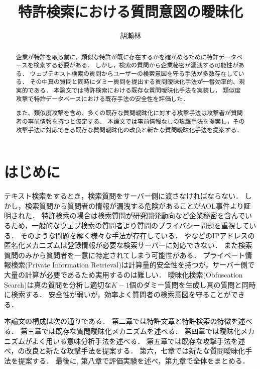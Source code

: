\documentclass[master]{suribt}
\title{特許検索における質問意図の曖昧化}
\author{胡瀚林}
\theoremstyle{definition}
\begin{document}
\maketitle%

\frontmatter%
\begin{abstract}%
 企業が特許を取る前に，類似な特許が既に存在するかを確かめるために特許データベースを検索する必要がある．
 しかし，検索の質問から企業秘密が漏洩する可能性がある．
 ウェブテキスト検索の質問からユーザーの検索意図を守る手法が多数存在している．
 その中真の質問と同時にダミー質問を提出する質問曖昧化手法が一番効率的、現実的である．
 本論文では特許検索における既存な質問曖昧化手法\cite{providing2009,embellishing2010,masking2014}を実装し，
 類似度攻撃\cite{simattack2016}で特許データベースにおける既存手法の安全性を評価した．

 また、類似度攻撃\cite{simattack2016}を含め、多くの既存な質問曖昧化に対する攻撃手法は攻撃者が質問者の事前情報を持つと仮定する．
 本論文では事前情報なしの攻撃手法を提案し，その攻撃手法に対応できる既存な質問曖昧化の改良と新たな質問曖昧化手法を提案する．
\end{abstract}

 \tableofcontents%

 \mainmatter%
 \chapter{はじめに}

 テキスト検索をするとき，検索質問をサーバー側に渡さなければならない．
 しかし，検索質問から質問者の情報が漏洩する危険があることがAOL事件\cite{AOL}より証明された．
 特許検索の場合は検索質問が研究開発動向など企業秘密を含んでいるため，一般的なウェブ検索の質問者より質問のプライバシー問題を重視している．
 そのような問題を解く様々な手法が存在している．
 \cite{tor2004}や\cite{private2007}などのIPアドレスの匿名化メカニズムは登録情報が必要な検索サーバーに対応できない．
 また検索質問のみから質問者を一意に特定されてしまう可能性がある．
 プライベート情報検索(Private Information Retrieval)\cite{pir1998}は計算量的安全性を持つが，サーバー側で大量の計算が必要であるため実用するのは難しい．
 曖昧化検索(Obfuscation Search)\cite{obs2012}は真の質問を分析し適切な$K−1$個のダミー質問を生成し真の質問と同時に検索する．
 安全性が弱いが，効率よく質問者の検索意図を守ることができる．
 

 本論文の構成は次の通りである．
 第二章では特許文章と特許検索の特徴を述べる．
 第三章では既存な質問曖昧化メカニズム\cite{providing2009,embellishing2010,masking2014}を述べる．
 第四章では曖昧化メカニズムがよく用いる意味分析手法を述べる．
 第五章では既存な攻撃手法\cite{simattack2016}を述べ，\cite{simattack2016}の改良と新たな攻撃手法を提案する．
 第六，七章では新たな質問曖昧化手法を提案する．
 最後に, 第八章で評価実験を述べ，第九章で全体をまとめる．
\end{document}
